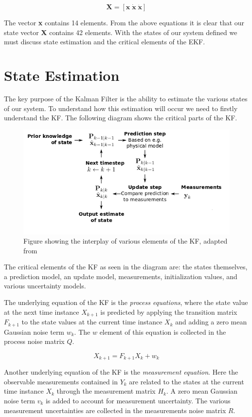 $$	\textbf{X}=[\textbf{x} \; \dot{\textbf{x}} \; \ddot{\textbf{x}}] $$

The vector \textbf{x} contains 14 elements. From the above equations it is clear that our state vector \textbf{X} contains 42 elements. With the states of our system defined we must discuss state estimation and the critical elements of the EKF.

\section{State Estimation}
The key purpose of the Kalman Filter is the ability to estimate the various states of our system. To understand how this estimation will occur we need to firstly understand the KF. The following diagram shows the critical parts of the KF.

\begin{figure}[!ht] 
\captionsetup{width=0.8\linewidth, font=small}  
\includegraphics[width=0.6\linewidth]{figures/kf.png}
\caption{Figure showing the interplay of various elements of the KF, adapted from \cite{kfkfkf}}
\label{fig:kf}
\end{figure}

The critical elements of the KF as seen in the diagram are: the states themselves, a prediction model, an update model, measurements, initialization values, and various uncertainty models. 

The underlying equation of the KF is the \textit{process equations}, where the state value at the next time instance $ X_{k+1} $ is predicted by applying the transition matrix $ F_{k+1} $ to the state values at the current time instance $ X_{k} $ and adding a zero mean Gaussian noise term $ w_{k} $. The $ w $ element of this equation is collected in the process noise matrix $ Q $. 

$$ X_{k+1} = F_{k+1}X_{k} + w_{k}  $$

Another underlying equation of the KF is the \textit{measurement equation}. Here the observable measurements contained in $ Y_k $ are related to the states at the current time instance $ X_{k} $ through the measurement matrix $ H_{k} $. A zero mean Gaussian noise term $ v_{k} $ is added to account for measurement uncertainty. The various measurement uncertainties are collected in the measurements noise matrix $ R $. 

